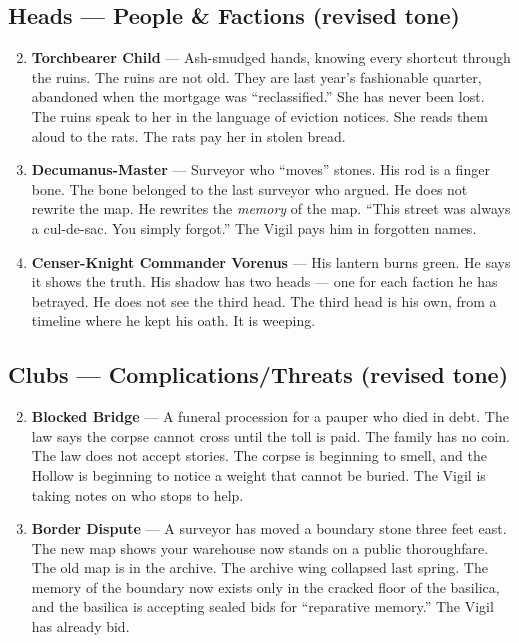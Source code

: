 \subsection*{Heads --- People \& Factions (revised tone)}
\begin{enumerate}
\setcounter{enumi}{1}
\item \textbf{Torchbearer Child} --- Ash-smudged hands, knowing every shortcut through the ruins. The ruins are not old. They are last year's fashionable quarter, abandoned when the mortgage was ``reclassified.'' She has never been lost. The ruins speak to her in the language of eviction notices. She reads them aloud to the rats. The rats pay her in stolen bread.
\item \textbf{Decumanus-Master} --- Surveyor who ``moves'' stones. His rod is a finger bone. The bone belonged to the last surveyor who argued. He does not rewrite the map. He rewrites the \textit{memory} of the map. ``This street was always a cul-de-sac. You simply forgot.'' The Vigil pays him in forgotten names.
\item \textbf{Censer-Knight Commander Vorenus} --- His lantern burns green. He says it shows the truth. His shadow has two heads --- one for each faction he has betrayed. He does not see the third head. The third head is his own, from a timeline where he kept his oath. It is weeping.
\end{enumerate}

\subsection*{Clubs --- Complications/Threats (revised tone)}
\begin{enumerate}
\setcounter{enumi}{1}
\item \textbf{Blocked Bridge} --- A funeral procession for a pauper who died in debt. The law says the corpse cannot cross until the toll is paid. The family has no coin. The law does not accept stories. The corpse is beginning to smell, and the Hollow is beginning to notice a weight that cannot be buried. The Vigil is taking notes on who stops to help.
\item \textbf{Border Dispute} --- A surveyor has moved a boundary stone three feet east. The new map shows your warehouse now stands on a public thoroughfare. The old map is in the archive. The archive wing collapsed last spring. The memory of the boundary now exists only in the cracked floor of the basilica, and the basilica is accepting sealed bids for ``reparative memory.'' The Vigil has already bid.
\end{enumerate}

